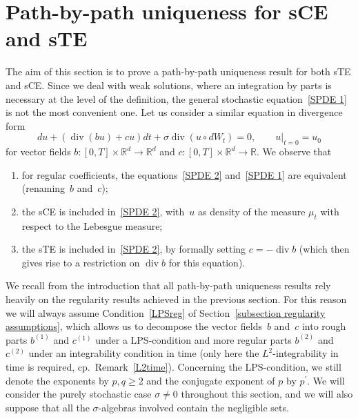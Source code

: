 \documentclass[a4paper,10pt]{article}
\newcommand\1{\mathbbm{1}}
\DeclareMathOperator{\diverg}{div}
\numberwithin{equation}{section}
\begin{document}
\section{Path-by-path uniqueness for sCE and sTE}\label{pbp_section}

The aim of this section is to prove a path-by-path uniqueness result for both
sTE and sCE. Since we deal with weak solutions, where an integration by parts
is necessary at the level of the definition, the general stochastic equation~\eqref{SPDE 1} is not the most convenient one. Let us consider a similar equation 
in divergence form
\begin{equation}
du+ (  \diverg (bu)  +cu )  dt+\sigma
\diverg  (  u\circ dW_{t})  =0,\qquad u|_{t=0}=u_{0}
\label{SPDE 2}
\end{equation}
for vector fields $b \colon [0,T] \times \mathbb{R}^d \to \mathbb{R}^d$ and $c \colon   [0,T] \times \mathbb{R}^d \to \mathbb{R}$. We observe that\begin{enumerate}[font=\normalfont, label=(\roman{*}), ref=(\roman{*})]
  \item for regular coefficients, the equations~\eqref{SPDE 2} and~\eqref{SPDE 1} are equivalent (renaming~$b$ and~$c$);
  \item the sCE is included in~\eqref{SPDE 2}, with~$u$ as density of the measure $\mu_t$ with respect to the Lebesgue measure;
  \item the sTE is included in~\eqref{SPDE 2}, by formally setting $c=-\diverg b$ (which then gives rise to a restriction  on $\diverg b$ for this equation).
\end{enumerate}

We recall from the introduction that all path-by-path uniqueness results rely heavily on the regularity results achieved in the previous section. For this reason we will always assume Condition~\ref{LPSreg} of Section~\ref{subsection regularity assumptions}, which allows us to decompose the vector fields~$b$ and~$c$ into rough parts $b^{(1)}$ and $c^{(1)}$ under a LPS-condition and more regular parts $b^{(2)}$ and $c^{(2)}$ under an integrability condition in time (only here the $L^2$-integrability in time is required, cp.~Remark~\ref{L2time}). Concerning the LPS-condition, we still denote the exponents by $p,q \geq 2$ and the conjugate exponent of $p$ by $p^{\prime}$. We will consider the purely stochastic case $\sigma\neq0$ throughout this section, and we will also suppose that all the $\sigma$-algebras involved contain the negligible sets.
\end{document}

